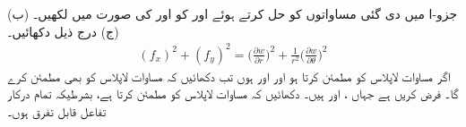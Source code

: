 (ب) جزو-ا میں دی گئی مساواتوں کو حل کرتے ہوئے   اور  کو  اور  کی صورت میں لکھیں۔ 
(ج) درج ذیل دکھائیں۔
\begin{align*}
(f_x)^2+(f_y)^2=\big(\frac{\partial w}{\partial r}\big)^2+\frac{1}{r^2}\big(\frac{\partial w}{\partial \theta}\big)^2
\end{align*}
اگر  مساوات  لاپلاس    کو مطمئن کرتا ہو اور  اور  ہوں   تب دکھائیں کہ   مساوات لاپلاس  کو بھی مطمئن کرے گا۔
فرض کریں  ہے جہاں ،  اور  ہیں۔ دکھائیں کہ  مساوات لاپلاس  کو مطمئن کرتا ہے، بشرطیکہ تمام درکار تفاعل قابل تفرق ہوں۔

